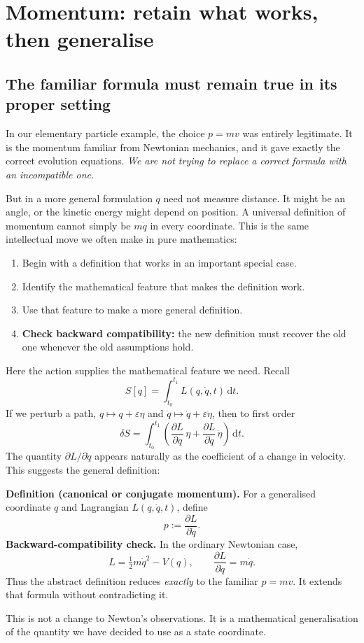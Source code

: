 \documentclass[11pt,a4paper,oneside]{article}
\newcommand{\dd}{\,\mathrm d}
\newcommand{\pd}[2]{\frac{\partial #1}{\partial #2}}
\begin{document}
\section{Momentum: retain what works, then generalise}
\subsection{The familiar formula must remain true in its proper setting}
In our elementary particle example, the choice $p=mv$ was entirely legitimate. It is the momentum familiar from Newtonian mechanics, and it gave exactly the correct evolution equations. \emph{We are not trying to replace a correct formula with an incompatible one.}

But in a more general formulation $q$ need not measure distance. It might be an angle, or the kinetic energy might depend on position. A universal definition of momentum cannot simply be $m\dot q$ in every coordinate. This is the same intellectual move we often make in pure mathematics:
\begin{enumerate}
 \item Begin with a definition that works in an important special case.
 \item Identify the mathematical feature that makes the definition work.
 \item Use that feature to make a more general definition.
 \item \textbf{Check backward compatibility:} the new definition must recover the old one whenever the old assumptions hold.
\end{enumerate}
Here the action supplies the mathematical feature we need. Recall
\[
 S[q]=\int_{t_0}^{t_1}L(q,\dot q,t)\dd t.
\]
If we perturb a path, $q\mapsto q+\varepsilon\eta$ and $\dot q\mapsto\dot q+\varepsilon\dot\eta$, then to first order
\[
 \delta S=\int_{t_0}^{t_1}\left(\pd{L}{q}\,\eta+\pd{L}{\dot q}\,\dot\eta\right)\dd t.
\]
The quantity $\partial L/\partial\dot q$ appears naturally as the coefficient of a change in velocity. This suggests the general definition:
\begin{keybox}
\textbf{Definition (canonical or conjugate momentum).} For a generalised coordinate $q$ and Lagrangian $L(q,\dot q,t)$, define
\begin{equation}\label{eq:momentum}
 \boxed{p:=\pd{L}{\dot q}.}
\end{equation}
\textbf{Backward-compatibility check.} In the ordinary Newtonian case,
\[
 L=\tfrac12m\dot q^2-V(q),\qquad
 \pd{L}{\dot q}=m\dot q.
\]
Thus the abstract definition reduces \emph{exactly} to the familiar $p=mv$. It extends that formula without contradicting it.
\end{keybox}
This is not a change to Newton's observations. It is a mathematical generalisation of the quantity we have decided to use as a state coordinate.
\end{document}
